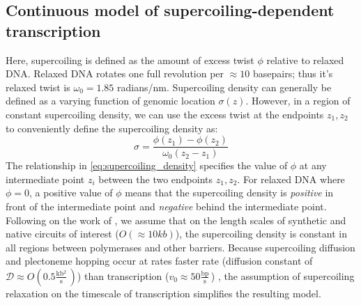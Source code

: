 \documentclass[11pt]{article}
\newcommand{\units}[2]{\frac{\text{#1}}{\text{#2}}\,}
\begin{document}
\subsection{Continuous model of supercoiling-dependent transcription}
Here, supercoiling is defined as the amount of excess twist \(\phi\) relative to relaxed DNA. Relaxed DNA rotates  one full revolution per \(\approx10\) basepairs; thus it's relaxed twist is \(\omega_0 = 1.85\) radians/nm. Supercoiling density can generally be defined as a varying function of genomic location \(\sigma(z)\). However, in a region of constant supercoiling density, we can use the excess twist at the endpoints \(z_1, z_2\) to conveniently define the supercoiling density as:
\begin{equation}
    \sigma = \frac{\phi(z_1) - \phi(z_2)}{\omega_0 (z_2 - z_1)}
\label{eq:supercoiling_density}
\end{equation}
The relationship in \cref{eq:supercoiling_density} specifies the value of \(\phi\) at any intermediate point \(z_i\) between the two endpoints \(z_1, z_2\). For relaxed DNA where \(\phi=0\), a positive value of \(\phi\) means that the supercoiling density is \emph{positive} in front of the intermediate point and \emph{negative} behind the intermediate point. Following on the work of \textcite{sevierPropertiesGeneExpression2018}, we assume that on the length scales of synthetic and native circuits of interest (\(O(\approx10kb)\)), the supercoiling density is constant in all regions between polymerases and other barriers. Because supercoiling diffusion and plectoneme hopping \parencite{loenhoutDynamicsDNASupercoils2012} occur at rates faster rate (diffusion constant of \(\mathcal{D} \approx O(0.5 \units{kb$^2$}{s})\)) than transcription (\(v_0 \approx 50 \units{bp}{s}\)) \parencite{munizRNAPolymeraseII2021}, the assumption of supercoiling relaxation on the timescale of transcription simplifies the resulting model.
\end{document}
